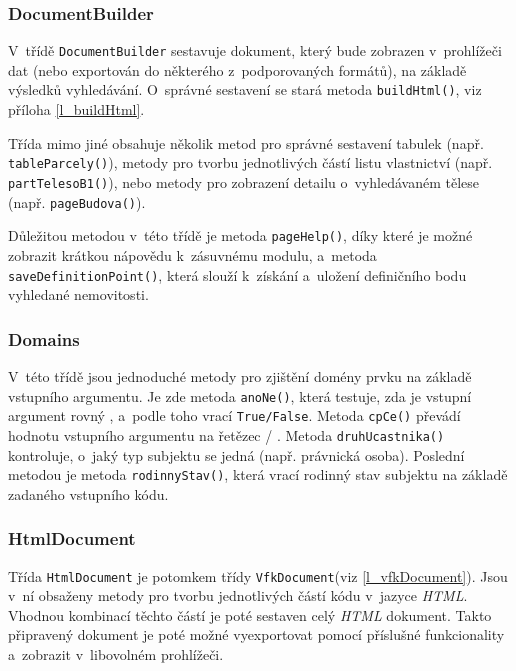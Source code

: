 \documentclass[a4paper,12pt,oneside]{book}
\begin{document}
\subsubsection{DocumentBuilder}
V~třídě \texttt{DocumentBuilder} sestavuje dokument, který bude
zobrazen v~prohlížeči dat (nebo exportován do některého
z~podporovaných formátů), na základě výsledků vyhledávání. O~správné
sestavení se stará metoda \texttt{buildHtml()}, viz příloha
\ref{l_buildHtml}.

Třída mimo jiné obsahuje několik metod pro správné sestavení tabulek
(např. \texttt{tableParcely()}), metody pro tvorbu jednotlivých částí
listu vlastnictví (např. \texttt{partTelesoB1()}), nebo metody pro
zobrazení detailu o~vyhledávaném tělese (např. \texttt{pageBudova()}).

Důležitou metodou v~této třídě je metoda \texttt{pageHelp()}, díky
které je možné zobrazit krátkou nápovědu k~zásuvnému modulu, a~metoda
\texttt{saveDefinitionPoint()}, která slouží
k~získání a~uložení definičního bodu vyhledané nemovitosti.

\subsubsection{Domains}
V~této třídě jsou jednoduché metody pro zjištění domény prvku na
základě vstupního argumentu. Je zde metoda \texttt{anoNe()}, která
testuje, zda je vstupní argument rovný , a~podle toho vrací
\texttt{True/False}. Metoda \texttt{cpCe()} převádí hodnotu
vstupního argumentu na řetězec  / . Metoda \texttt{druhUcastnika()} kontroluje, o~jaký
typ subjektu se jedná (např. právnická osoba). Poslední metodou je
metoda \texttt{rodinnyStav()}, která vrací rodinný stav subjektu na
základě zadaného vstupního kódu.

\subsubsection{HtmlDocument}

Třída \texttt{HtmlDocument} je potomkem třídy \texttt{VfkDocument}(viz
\ref{l_vfkDocument}). Jsou v~ní obsaženy metody pro tvorbu
jednotlivých částí kódu v~jazyce \textit{HTML}. Vhodnou kombinací
těchto částí je poté sestaven celý \textit{HTML} dokument. Takto
připravený dokument je poté možné vyexportovat pomocí příslušné
funkcionality a~zobrazit v~libovolném prohlížeči.
\end{document}
